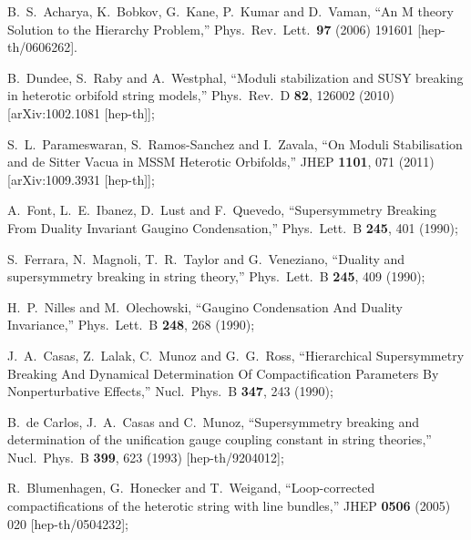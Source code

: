 \documentclass[11pt,a4paper]{article}
\begin{document}
\begin{thebibliography}{99}
  B.~S.~Acharya, K.~Bobkov, G.~Kane, P.~Kumar and D.~Vaman,
  ``An M theory Solution to the Hierarchy Problem,''
  Phys.\ Rev.\ Lett.\  {\bf 97} (2006) 191601
  [hep-th/0606262].



  B.~Dundee, S.~Raby and A.~Westphal,
  ``Moduli stabilization and SUSY breaking in heterotic orbifold string models,''
  Phys.\ Rev.\ D {\bf 82}, 126002 (2010)
  [arXiv:1002.1081 [hep-th]];

  S.~L.~Parameswaran, S.~Ramos-Sanchez and I.~Zavala,
  ``On Moduli Stabilisation and de Sitter Vacua in MSSM Heterotic Orbifolds,''
  JHEP {\bf 1101}, 071 (2011)
  [arXiv:1009.3931 [hep-th]];


  A.~Font, L.~E.~Ibanez, D.~Lust and F.~Quevedo,
  ``Supersymmetry Breaking From Duality Invariant Gaugino Condensation,''
  Phys.\ Lett.\ B {\bf 245}, 401 (1990);

  S.~Ferrara, N.~Magnoli, T.~R.~Taylor and G.~Veneziano,
  ``Duality and supersymmetry breaking in string theory,''
  Phys.\ Lett.\ B {\bf 245}, 409 (1990);

  H.~P.~Nilles and M.~Olechowski,
  ``Gaugino Condensation And Duality Invariance,''
  Phys.\ Lett.\ B {\bf 248}, 268 (1990);


  J.~A.~Casas, Z.~Lalak, C.~Munoz and G.~G.~Ross,
  ``Hierarchical Supersymmetry Breaking And Dynamical Determination Of Compactification Parameters By Nonperturbative Effects,''
  Nucl.\ Phys.\ B {\bf 347}, 243 (1990);

  B.~de Carlos, J.~A.~Casas and C.~Munoz,
  ``Supersymmetry breaking and determination of the unification gauge coupling constant in string theories,''
  Nucl.\ Phys.\ B {\bf 399}, 623 (1993)
  [hep-th/9204012];
  
   R.~Blumenhagen, G.~Honecker and T.~Weigand,
  ``Loop-corrected compactifications of the heterotic string with line bundles,''
  JHEP {\bf 0506} (2005) 020
  [hep-th/0504232];
  


\end{thebibliography}
\end{document}
